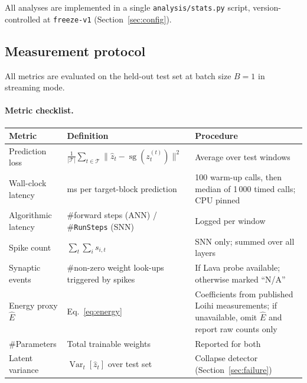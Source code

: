 \documentclass[11pt,a4paper]{article}
\newcommand{\sg}{\operatorname{sg}}        %
\begin{document}
\noindent All analyses are implemented in a single
\texttt{analysis/stats.py} script, version-controlled at
\texttt{freeze-v1} (Section~\ref{sec:config}).

\subsection{Measurement protocol}\label{sec:measurement}

All metrics are evaluated on the held-out test set at batch size $B=1$
in streaming mode.

\paragraph{Metric checklist.}
\nopagebreak
\begin{center}
\renewcommand{\arraystretch}{1.15}
\begin{tabular}{@{}p{3.2cm}p{4.8cm}p{4.2cm}@{}}
\toprule
\textbf{Metric} & \textbf{Definition} & \textbf{Procedure} \\
\midrule
Prediction loss
  & $\frac{1}{|\mathcal{T}|}\sum_{t\in\mathcal{T}}
     \lVert\hat{z}_t - \sg(z_t^{(t)})\rVert^2$
  & Average over test windows \\
Wall-clock latency
  & ms per target-block prediction
  & 100 warm-up calls, then median of 1\,000 timed calls; CPU pinned \\
Algorithmic latency
  & \#forward steps (ANN) /
    \#\texttt{RunSteps} (SNN)
  & Logged per window \\
Spike count
  & $\sum_t \sum_i s_{i,t}$
  & SNN only; summed over all layers \\
Synaptic events
  & \#non-zero weight look-ups triggered by spikes
  & If Lava probe available; otherwise marked ``N/A'' \\
Energy proxy $\hat{E}$
  & Eq.~\eqref{eq:energy}
  & Coefficients from published Loihi measurements;
    if unavailable, omit $\hat{E}$ and report raw counts only \\
\#Parameters
  & Total trainable weights
  & Reported for both \\
Latent variance
  & $\operatorname{Var}_{t}[\hat{z}_t]$ over test set
  & Collapse detector (Section~\ref{sec:failure}) \\
\bottomrule
\end{tabular}
\end{center}
\end{document}
